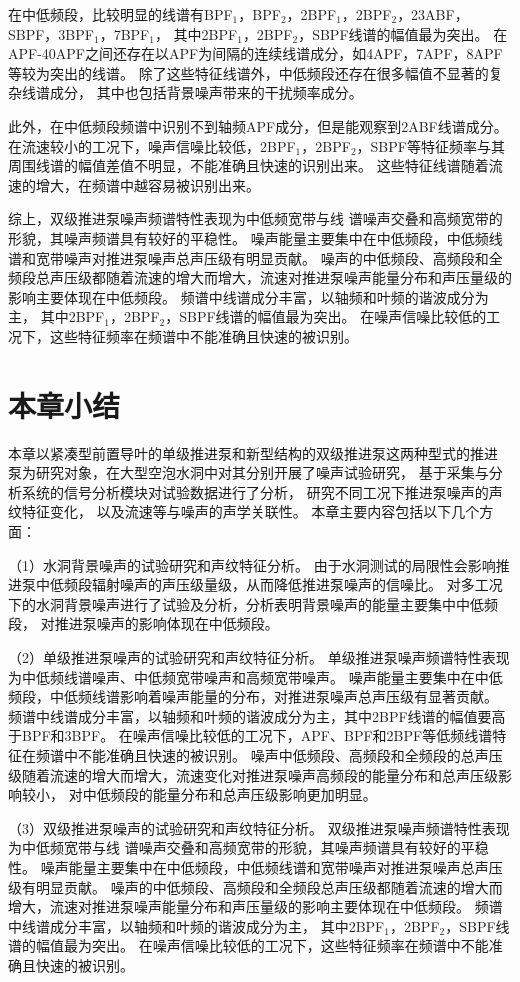 在中低频段，比较明显的线谱有BPF$_1$，BPF$_2$，2BPF$_1$，2BPF$_2$，23ABF，SBPF，3BPF$_1$，7BPF$_1$，
其中2BPF$_1$，2BPF$_2$，SBPF线谱的幅值最为突出。
在APF-40APF之间还存在以APF为间隔的连续线谱成分，如4APF，7APF，8APF等较为突出的线谱。
除了这些特征线谱外，中低频段还存在很多幅值不显著的复杂线谱成分，
其中也包括背景噪声带来的干扰频率成分。

此外，在中低频段频谱中识别不到轴频APF成分，但是能观察到2ABF线谱成分。
在流速较小的工况下，噪声信噪比较低，2BPF$_1$，2BPF$_2$，SBPF等特征频率与其周围线谱的幅值差值不明显，不能准确且快速的识别出来。
这些特征线谱随着流速的增大，在频谱中越容易被识别出来。

综上，双级推进泵噪声频谱特性表现为中低频宽带与线
谱噪声交叠和高频宽带的形貌，其噪声频谱具有较好的平稳性。
噪声能量主要集中在中低频段，中低频线谱和宽带噪声对推进泵噪声总声压级有明显贡献。
噪声的中低频段、高频段和全频段总声压级都随着流速的增大而增大，流速对推进泵噪声能量分布和声压量级的影响主要体现在中低频段。
频谱中线谱成分丰富，以轴频和叶频的谐波成分为主，
其中2BPF$_1$，2BPF$_2$，SBPF线谱的幅值最为突出。
在噪声信噪比较低的工况下，这些特征频率在频谱中不能准确且快速的被识别。

\section{本章小结}
本章以紧凑型前置导叶的单级推进泵和新型结构的双级推进泵这两种型式的推进
泵为研究对象，在大型空泡水洞中对其分别开展了噪声试验研究，
基于采集与分析系统的信号分析模块对试验数据进行了分析，
研究不同工况下推进泵噪声的声纹特征变化，
以及流速等与噪声的声学关联性。
本章主要内容包括以下几个方面：

（1）水洞背景噪声的试验研究和声纹特征分析。
由于水洞测试的局限性会影响推进泵中低频段辐射噪声的声压级量级，从而降低推进泵噪声的信噪比。
对多工况下的水洞背景噪声进行了试验及分析，分析表明背景噪声的能量主要集中中低频段，
对推进泵噪声的影响体现在中低频段。

（2）单级推进泵噪声的试验研究和声纹特征分析。
单级推进泵噪声频谱特性表现为中低频线谱噪声、中低频宽带噪声和高频宽带噪声。
噪声能量主要集中在中低频段，中低频线谱影响着噪声能量的分布，对推进泵噪声总声压级有显著贡献。
频谱中线谱成分丰富，以轴频和叶频的谐波成分为主，其中2BPF线谱的幅值要高于BPF和3BPF。
在噪声信噪比较低的工况下，APF、BPF和2BPF等低频线谱特征在频谱中不能准确且快速的被识别。
噪声中低频段、高频段和全频段的总声压级随着流速的增大而增大，流速变化对推进泵噪声高频段的能量分布和总声压级影响较小，
对中低频段的能量分布和总声压级影响更加明显。

（3）双级推进泵噪声的试验研究和声纹特征分析。
双级推进泵噪声频谱特性表现为中低频宽带与线
谱噪声交叠和高频宽带的形貌，其噪声频谱具有较好的平稳性。
噪声能量主要集中在中低频段，中低频线谱和宽带噪声对推进泵噪声总声压级有明显贡献。
噪声的中低频段、高频段和全频段总声压级都随着流速的增大而增大，流速对推进泵噪声能量分布和声压量级的影响主要体现在中低频段。
频谱中线谱成分丰富，以轴频和叶频的谐波成分为主，
其中2BPF$_1$，2BPF$_2$，SBPF线谱的幅值最为突出。
在噪声信噪比较低的工况下，这些特征频率在频谱中不能准确且快速的被识别。

